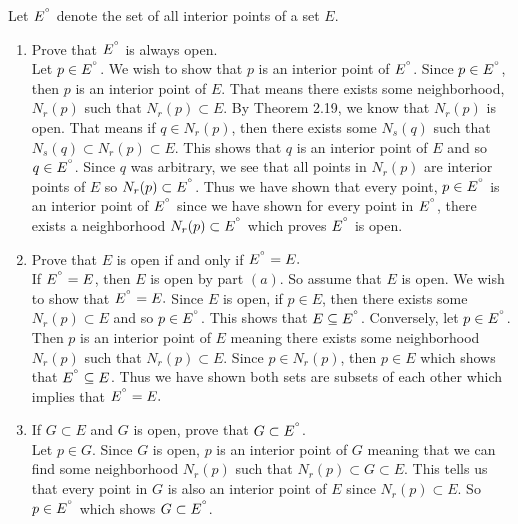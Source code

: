 \documentclass[12pt]{article}
\begin{document}
\problem Let $E^{\degree}$ denote the set of all interior points of a set $E$.
\begin{enumerate}
\item Prove that $E^{\degree}$ is always open. \\ 

Let $p \in E^{\degree}$. We wish to show that $p$ is an interior point of $E^{\degree}$. Since $p \in E^{\degree}$, then $p$ is an interior point of $E$. That means there exists some neighborhood, $N_{r}(p)$ such that $N_{r}(p) \subset E$. By Theorem 2.19, we know that $N_{r}(p)$ is open. That means if $q \in N_{r}(p)$, then there exists some $N_{s}(q)$ such that $N_{s}(q) \subset N_{r}(p) \subset E$. This shows that $q$ is an interior point of $E$ and so $q \in E^{\degree}$. Since $q$ was arbitrary, we see that all points in $N_{r}(p)$ are interior points of $E$ so $N_{r}(p) \subset E^{\degree}$. Thus we have shown that every point, $p \in E^{\degree}$ is an interior point of $E^{\degree}$ since we have shown for every point in $E^{\degree}$, there exists a neighborhood $N_{r}(p) \subset E^{\degree}$ which proves $E^{\degree}$ is open. \\

\item Prove that $E$ is open if and only if $E^{\degree}=E.$ \\ 

If $E^{\degree}=E$, then $E$ is open by part $(a)$. So assume that $E$ is open. We wish to show that $E^{\degree}=E.$ Since $E$ is open, if $p \in E$, then there exists some $N_{r}(p) \subset E$ and so $p \in E^{\degree}$. This shows that $E \subseteq E^{\degree}$. Conversely, let $p \in E^{\degree}$. Then $p$ is an interior point of $E$ meaning there exists some neighborhood $N_{r}(p)$ such that $N_{r}(p) \subset E$. Since $p \in N_{r}(p)$, then $p \in E$ which shows that $E^{\degree} \subseteq E$. Thus we have shown both sets are subsets of each other which implies that $E^{\degree}=E.$ \\

\item If $G \subset E$ and $G$ is open, prove that $G \subset E^{\degree}$.\\

Let $p \in G$. Since $G$ is open, $p$ is an interior point of $G$ meaning that we can find some neighborhood $N_{r}(p)$ such that $N_{r}(p) \subset G \subset E$. This tells us that every point in $G$ is also an interior point of $E$ since $N_{r}(p) \subset E$. So $p \in E^{\degree}$ which shows $G \subset E^{\degree}$. \\  


\end{enumerate}
\end{document}
